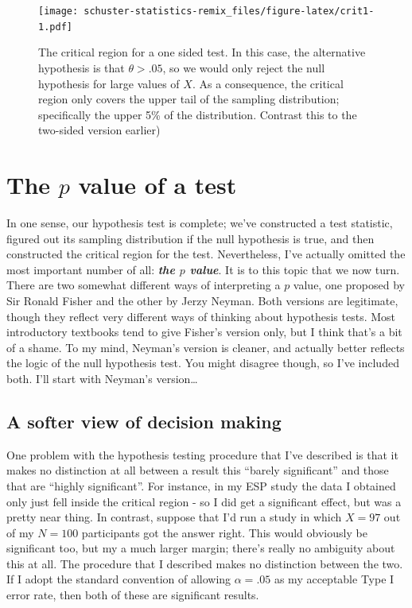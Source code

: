 \documentclass[
]{book}
\begin{document}
\begin{figure}
\centering
\texttt{[image: schuster-statistics-remix\_files/figure-latex/crit1-1.pdf]}
\caption{\label{fig:crit1}The critical region for a one sided test. In this case, the alternative hypothesis is that \(\theta > .05\), so we would only reject the null hypothesis for large values of \(X\). As a consequence, the critical region only covers the upper tail of the sampling distribution; specifically the upper 5\% of the distribution. Contrast this to the two-sided version earlier)}
\end{figure}

\hypertarget{pvalue}{%
\section{\texorpdfstring{The \(p\) value of a test}{The p value of a test}}\label{pvalue}}

In one sense, our hypothesis test is complete; we've constructed a test statistic, figured out its sampling distribution if the null hypothesis is true, and then constructed the critical region for the test. Nevertheless, I've actually omitted the most important number of all: \textbf{\emph{the \(p\) value}}. It is to this topic that we now turn. There are two somewhat different ways of interpreting a \(p\) value, one proposed by Sir Ronald Fisher and the other by Jerzy Neyman. Both versions are legitimate, though they reflect very different ways of thinking about hypothesis tests. Most introductory textbooks tend to give Fisher's version only, but I think that's a bit of a shame. To my mind, Neyman's version is cleaner, and actually better reflects the logic of the null hypothesis test. You might disagree though, so I've included both. I'll start with Neyman's version\ldots{}

\hypertarget{a-softer-view-of-decision-making}{%
\subsection{A softer view of decision making}\label{a-softer-view-of-decision-making}}

One problem with the hypothesis testing procedure that I've described is that it makes no distinction at all between a result this ``barely significant'' and those that are ``highly significant''. For instance, in my ESP study the data I obtained only just fell inside the critical region - so I did get a significant effect, but was a pretty near thing. In contrast, suppose that I'd run a study in which \(X=97\) out of my \(N=100\) participants got the answer right. This would obviously be significant too, but my a much larger margin; there's really no ambiguity about this at all. The procedure that I described makes no distinction between the two. If I adopt the standard convention of allowing \(\alpha = .05\) as my acceptable Type I error rate, then both of these are significant results.
\end{document}
